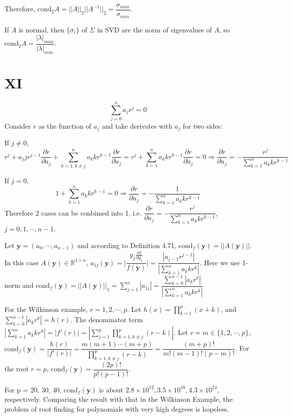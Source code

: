 \documentclass[a4paper]{article}
\begin{document}
Therefore, $\text{cond}_2 A = ||A||_2 ||A^{-1}||_2 = \dfrac{\sigma_{max}}{\sigma_{min}}$.

If $A$ is normal, then $\{\sigma_i\}$ of $\Sigma$ in SVD are the norm of eigenvalues of $A$, so $\text{cond}_2 A = \dfrac{|\lambda|_{max}}{|\lambda|_{min}}$.

\section*{XI}
$$
\sum\limits_{j=0}^n a_j r^j = 0
$$
Consider $r$ as the function of $a_j$ and take derivates with $a_j$ for two sides:

If $j \neq 0$,
$$
r^j + a_j j r^{j-1} \frac{\partial r}{\partial a_j} + \sum\limits_{k=1,k\neq j}^n a_k k r^{k-1} \frac{\partial r}{\partial a_j}
= r^j + \sum\limits_{k=1}^n a_k k r^{k-1} \frac{\partial r}{\partial a_j} = 0
\Longrightarrow
\frac{\partial r}{\partial a_j} = -\frac{r^j}{\sum\limits_{k=1}^n a_k k r^{k-1}}
$$

If $j = 0$,
$$
1 + \sum\limits_{k=1}^n a_k k r^{k-1} = 0
\Longrightarrow
\frac{\partial r}{\partial a_j} = -\frac{1}{\sum\limits_{k=1}^n a_k k r^{k-1}}
$$
Therefore 2 cases can be conbimed into 1, i.e. $\dfrac{\partial r}{\partial a_j} = -\dfrac{r^j}{\sum\limits_{k=1}^n a_k k r^{k-1}}$, $j = 0,1,\cdots,n-1$.

Let $\textbf{y} = (a_0,\cdots,a_{n-1})$ and according to Definition 4.71, $\text{cond}_f(\textbf{y}) = ||A(\textbf{y})||$. In this case $A(\textbf{y}) \in \mathbb{R}^{1\times n}$, 
$a_{1j}(\textbf{y}) = \Bigg| \dfrac{y_j\frac{\partial f}{\partial y_j}}{f(\textbf{y})} \Bigg|
= \dfrac{|a_{j-1}r^{j-1}|}{|\sum\limits_{k=1}^n a_k k r^k|}$. Here we use 1-norm and $\text{cond}_f(\textbf{y}) = ||A(\textbf{y})||_1 = \sum\limits_{j=1}^{n}|a_{1j}| = \dfrac{\sum\limits_{k=0}^{n-1}|a_k r^k|}{|\sum\limits_{k=1}^n a_k k r^k|}$

For the Wilkinson example, $r = 1,2,\cdots,p$. Let $h(x) = \prod\limits_{k=1}^p (x+k)$, and $\sum\limits_{k=0}^{n-1}|a_k r^k| = h(r)$. The denominator term $|\sum\limits_{k=1}^n a_k k r^k| = |f'(r)| = |\sum\limits_{j=1}^p\prod\limits_
{k=1,k\neq j}^p (r-k)|$. Let $r = m \in \{1,2,\cdots,p\}$, $\text{cond}_f(\textbf{y}) = \dfrac{h(r)}{|f'(r)|} = \dfrac{m(m+1)\cdots(m+p)}{\prod\limits_{k=1,k\neq j}^p(r-k)} = \dfrac{(m+p)!}{m!(m-1)!(p-m)!}$. For the root $r = p$, 
$\text{cond}_f(\textbf{y}) = \dfrac{(2p)!}{p!(p-1)!}$.

For p = 20, 30, 40, $\text{cond}_f(\textbf{y})$ is about $2.8\times 10^{12}, 3.5\times 10^{18}, 4.3\times 10^{24}$, respectively. Comparing the result with that in the Wilkinson Example, the problem of root finding for polynomials with very high degrees is hopeless.
\end{document}
